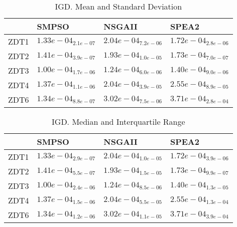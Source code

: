 \documentclass{article}
\begin{document}
\begin{table}
\caption{IGD. Mean and Standard Deviation}
\label{table: IGD}
\centering
\begin{scriptsize}
\begin{tabular}{llll}
\hline & SMPSO & NSGAII &  SPEA2\\
\hline 
ZDT1 & \cellcolor{gray95}$  1.33e-04_{ 2.1e-07}$ & $  2.04e-04_{ 7.2e-06}$ & \cellcolor{gray25}$  1.72e-04_{ 2.8e-06}$ \\
ZDT2 & \cellcolor{gray95}$  1.41e-04_{ 3.9e-07}$ & $  1.93e-04_{ 1.0e-05}$ & \cellcolor{gray25}$  1.73e-04_{ 7.0e-07}$ \\
ZDT3 & \cellcolor{gray95}$  1.00e-04_{ 1.7e-06}$ & \cellcolor{gray25}$  1.24e-04_{ 6.0e-06}$ & $  1.40e-04_{ 9.0e-06}$ \\
ZDT4 & \cellcolor{gray95}$  1.37e-04_{ 1.1e-06}$ & \cellcolor{gray25}$  2.04e-04_{ 3.9e-05}$ & $  2.55e-04_{ 8.9e-05}$ \\
ZDT6 & \cellcolor{gray95}$  1.34e-04_{ 8.8e-07}$ & \cellcolor{gray25}$  3.02e-04_{ 7.5e-06}$ & $  3.71e-04_{ 2.8e-04}$ \\
\hline
\end{tabular}
\end{scriptsize}
\end{table}

\begin{table}
\caption{IGD. Median and Interquartile Range}
\label{table: IGD}
\centering
\begin{scriptsize}
\begin{tabular}{llll}
\hline & SMPSO & NSGAII &  SPEA2\\
\hline 
ZDT1 & \cellcolor{gray95}$  1.33e-04_{ 2.9e-07}$ & $  2.04e-04_{ 1.0e-05}$ & \cellcolor{gray25}$  1.72e-04_{ 3.9e-06}$ \\
ZDT2 & \cellcolor{gray95}$  1.41e-04_{ 5.5e-07}$ & $  1.93e-04_{ 1.5e-05}$ & \cellcolor{gray25}$  1.73e-04_{ 9.9e-07}$ \\
ZDT3 & \cellcolor{gray95}$  1.00e-04_{ 2.4e-06}$ & \cellcolor{gray25}$  1.24e-04_{ 8.5e-06}$ & $  1.40e-04_{ 1.3e-05}$ \\
ZDT4 & \cellcolor{gray95}$  1.37e-04_{ 1.5e-06}$ & \cellcolor{gray25}$  2.04e-04_{ 5.5e-05}$ & $  2.55e-04_{ 1.3e-04}$ \\
ZDT6 & \cellcolor{gray95}$  1.34e-04_{ 1.2e-06}$ & \cellcolor{gray25}$  3.02e-04_{ 1.1e-05}$ & $  3.71e-04_{ 3.9e-04}$ \\
\hline
\end{tabular}
\end{scriptsize}
\end{table}
\end{document}
